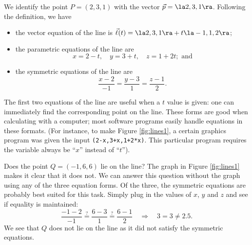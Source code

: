 {We identify the point $P=(2,3,1)$ with the vector $\vec p =\la 2,3,1\ra$. Following the definition, we have
\begin{itemize}
	\item the vector equation of the line is $\vec\ell(t) = \la 2,3,1\ra + t\la -1,1,2\ra$;
	\item	the parametric equations of the line are
	\[
	x = 2-t,\quad y = 3+t,\quad z = 1+2t; \text{ and}
	\]
	\item	the symmetric equations of the line are
	\[
	\frac{x-2}{-1}=\frac{y-3}{1} = \frac{z-1}{2}.
	\]
\end{itemize}

The first two equations of the line are useful when a $t$ value is given: one can immediately find the corresponding point on the line. These forms are good when calculating with a computer; most software programs easily handle equations in these formats. (For instance, to make Figure \ref{fig:lines1}, a certain graphics program was given the input \texttt{(2-x,3+x,1+2*x)}. This particular program requires the variable always be ``$x$'' instead of ``$t$'').

Does the point $Q = (-1,6,6)$ lie on the line? The graph in Figure \ref{fig:lines1} makes it clear that it does not. We can answer this question without the graph using any of the three equation forms. Of the three, the symmetric equations are probably best suited for this task. Simply plug in the values of $x$, $y$ and $z$ and see if equality is maintained:
\[
 \frac{-1-2}{-1} \stackrel{?}{=} \frac{6-3}{1} \stackrel{?}{=} \frac{6-1}{2} \quad \Rightarrow \quad 3=3\neq2.5.
 \]
We see that $Q$ does not lie on the line as it did not satisfy the symmetric equations.
}\\

